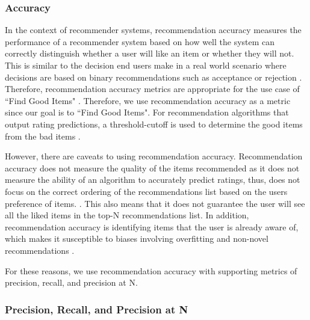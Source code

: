 \subsubsection{}

\subsubsection{ Accuracy}

In the context of recommender systems, recommendation accuracy measures the performance of a recommender system based on how well the system can correctly distinguish whether a user will like an item or whether they will not. This is similar to the decision end users make in a real world scenario where decisions are based on binary recommendations such as acceptance or rejection \cite{zhang}. Therefore, recommendation accuracy metrics are appropriate for the use case of ``Find Good Items" \cite{evaluation}. Therefore, we use recommendation accuracy as a metric since our goal is to ``Find Good Items". For recommendation algorithms that output rating predictions, a threshold-cutoff is used to determine the good items from the bad items \cite{zhang}.

However, there are caveats to using recommendation accuracy. Recommendation accuracy does not measure the quality of the items recommended as it does not measure the ability of an algorithm to accurately predict ratings, thus, does not focus on the correct ordering of the recommendations list based on the users preference of items. . This also means that it does not guarantee the user will see all the liked items in the top-N recommendations list. In addition, recommendation accuracy is identifying items that the user is already aware of, which makes it susceptible to biases involving overfitting and non-novel recommendations \cite{evaluation}. 

For these reasons, we use recommendation accuracy with supporting metrics of precision, recall, and precision at N. 

\subsubsection{Precision, Recall, and Precision at N}

